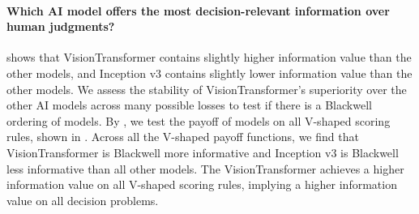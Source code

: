 \paragraph{Which AI model offers the most decision-relevant information over human judgments?} 
 shows that VisionTransformer contains slightly higher information value than the other models, and Inception v3 contains slightly lower information value than the other models.
We assess the stability of VisionTransformer's superiority over the other AI models across many possible losses to test if there is a Blackwell ordering of models.
By , we test the payoff of models on all V-shaped scoring rules, shown in .
Across all the V-shaped payoff functions, we find that VisionTransformer is Blackwell more informative and Inception v3 is Blackwell less informative than all other models. 
The VisionTransformer achieves a higher information value on all V-shaped scoring rules, implying a higher information value on all decision problems.


